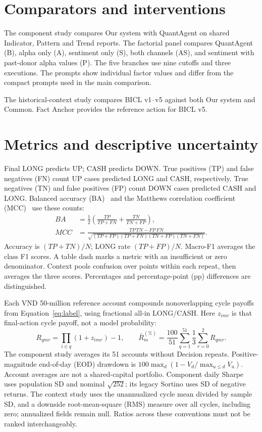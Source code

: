 \section{Comparators and interventions}\label{s:351598650d1ea43f}
The component study compares Our system with QuantAgent on shared
Indicator, Pattern and Trend reports. The factorial panel compares
QuantAgent (B), alpha only (A), sentiment only (S), both channels (AS),
and sentiment with past-donor alpha values (P). The five branches use
nine cutoffs and three executions. The prompts show individual factor
values and differ from the compact prompts used in the main comparison.

The historical-context study compares BICL v1--v5 against both Our system
and Common. Fact Anchor provides the reference action for BICL v5.

\section{Metrics and descriptive uncertainty}\label{s:ef6038a5b0f5c76d}
Final LONG predicts UP; CASH predicts DOWN. True positives (TP) and false
negatives (FN) count UP cases predicted LONG and CASH, respectively.
True negatives (TN) and false positives (FP) count DOWN cases predicted
CASH and LONG. Balanced accuracy (BA)~\cite{brodersen2010balanced} and
the Matthews correlation coefficient (MCC)~\cite{chicco2020mcc} use
these counts:
\begin{align}
BA&=\tfrac12\left(\frac{TP}{TP+FN}+\frac{TN}{TN+FP}\right),\\
MCC&=\frac{TP\,TN-FP\,FN}{\sqrt{(TP+FP)(TP+FN)(TN+FP)(TN+FN)}}.
\end{align}
Accuracy is $(TP+TN)/N$; LONG rate $(TP+FP)/N$. Macro-F1 averages the
class F1 scores. A table dash marks a metric with an insufficient or zero denominator. Context pools
confusion over points within each repeat, then averages the three scores.
Percentages and percentage-point (pp) differences are distinguished.

Each VND 50-million reference account compounds nonoverlapping cycle
payoffs from Equation~\ref{eq:label}, using fractional all-in LONG/CASH.
Here $z_{imr}$ is that final-action cycle payoff, not a model probability:
\begin{equation}
R_{qmr}=\prod_{i\in q}(1+z_{imr})-1,\qquad
\bar R_m^{(\%)}=\frac{100}{51}\sum_{q=1}^{51}\frac13\sum_{r=0}^2R_{qmr}.
\end{equation}
The component study averages its 51 accounts without Decision repeats. Positive-magnitude end-of-day (EOD) drawdown is
$100\max_d(1-V_d/\max_{u\le d}V_u)$. Account averages are not a shared-capital
portfolio. Component daily Sharpe~\cite{sharpe1966mutual} uses population SD and nominal
$\sqrt{252}$; its legacy Sortino uses SD of negative returns. The context study uses the unannualized cycle mean divided by sample SD,
and a downside root-mean-square (RMS) measure over all cycles,
including zero; annualized fields remain null. Ratios across these
conventions must not be ranked interchangeably.

